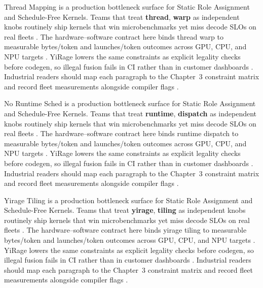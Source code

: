 Thread Mapping is a production bottleneck surface for Static Role Assignment and Schedule-Free Kernels. Teams that treat \textbf{thread}, \textbf{warp} as independent knobs routinely ship kernels that win microbenchmarks yet miss decode SLOs on real fleets \citep{amd2024xdna,dao2022flashattention}. The hardware--software contract here binds thread warp to measurable bytes/token and launches/token outcomes across GPU, CPU, and NPU targets \citep{amd2024aie,kwon2023vllm}. YiRage lowers the same constraints as explicit legality checks before codegen, so illegal fusion fails in CI rather than in customer dashboards \citep{dlbook,nvidia2024cudagraphs}. Industrial readers should map each paragraph to the Chapter~3 constraint matrix and record fleet measurements alongside compiler flags \citep{dao2022flashattention,liu2024deepseekv3}.

No Runtime Sched is a production bottleneck surface for Static Role Assignment and Schedule-Free Kernels. Teams that treat \textbf{runtime}, \textbf{dispatch} as independent knobs routinely ship kernels that win microbenchmarks yet miss decode SLOs on real fleets \citep{amd2024aie,kwon2023vllm}. The hardware--software contract here binds runtime dispatch to measurable bytes/token and launches/token outcomes across GPU, CPU, and NPU targets \citep{dlbook,nvidia2024cudagraphs}. YiRage lowers the same constraints as explicit legality checks before codegen, so illegal fusion fails in CI rather than in customer dashboards \citep{dao2022flashattention,liu2024deepseekv3}. Industrial readers should map each paragraph to the Chapter~3 constraint matrix and record fleet measurements alongside compiler flags \citep{kwon2023vllm,patel2025llminference}.

Yirage Tiling is a production bottleneck surface for Static Role Assignment and Schedule-Free Kernels. Teams that treat \textbf{yirage}, \textbf{tiling} as independent knobs routinely ship kernels that win microbenchmarks yet miss decode SLOs on real fleets \citep{dlbook,nvidia2024cudagraphs}. The hardware--software contract here binds yirage tiling to measurable bytes/token and launches/token outcomes across GPU, CPU, and NPU targets \citep{dao2022flashattention,liu2024deepseekv3}. YiRage lowers the same constraints as explicit legality checks before codegen, so illegal fusion fails in CI rather than in customer dashboards \citep{kwon2023vllm,patel2025llminference}. Industrial readers should map each paragraph to the Chapter~3 constraint matrix and record fleet measurements alongside compiler flags \citep{nvidia2024cudagraphs,taxbreak2026}.

